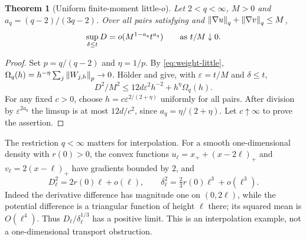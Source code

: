 \documentclass[11pt]{article}
\numberwithin{equation}{section}
\newtheorem{theorem}{Theorem}[section]
\theoremstyle{remark}\newtheorem{remark}[theorem]{Remark}
\begin{document}
\begin{theorem}[Uniform finite-moment little-$o$]\label{thm:little-q}
Let $2<q<\infty$, $M>0$ and $a_q=(q-2)/(3q-2)$. Over all pairs satisfying  and
$\left\lVert\nabla u\right\rVert_q+\left\lVert\nabla v\right\rVert_q\le M$,
\begin{equation}\label{eq:little-q}
 \sup_{\delta\le t}D=o(M^{1-a_q}t^{a_q})
 \qquad\hbox{as }t/M\downarrow0.
\end{equation}
\end{theorem}
\begin{proof}
Set $p=q/(q-2)$ and $\eta=1/p$. By \eqref{eq:weight-little},
$\Omega_q(h)=h^{-\eta}\sum_j\left\lVert W_{j,h}\right\rVert_p\to0$.
H\"older and  give, with $\varepsilon=t/M$ and $\delta\le t$,
\[
 D^2/M^2\le12d\varepsilon^2h^{-2}+h^\eta\Omega_q(h).
\]
For any fixed $c>0$, choose $h=c\varepsilon^{2/(2+\eta)}$ uniformly for all pairs. After division by $\varepsilon^{2a_q}$ the limsup is at most $12d/c^2$, since $a_q=\eta/(2+\eta)$. Let $c\uparrow\infty$ to prove the assertion.
\end{proof}

The restriction $q<\infty$ matters for interpolation. For a smooth one-dimensional density with $r(0)>0$, the convex functions
$u_\ell=x_++(x-2\ell)_+$ and $v_\ell=2(x-\ell)_+$ have gradients bounded by $2$, and
\[
 D_\ell^2=2r(0)\ell+o(\ell),\qquad
 \delta_\ell^2=\tfrac23r(0)\ell^3+o(\ell^3).
\]
Indeed the derivative difference has magnitude one on $(0,2\ell)$, while the potential difference is a triangular function of height $\ell$ there; its squared mean is $O(\ell^4)$. Thus $D_\ell/\delta_\ell^{1/3}$ has a positive limit. This is an interpolation example, not a one-dimensional transport obstruction.
\end{document}
